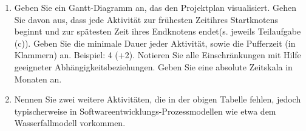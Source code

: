 \documentclass{lehramt-informatik-minimal}
\begin{document}
\begin{enumerate}

\item Geben Sie ein Gantt-Diagramm an, das den Projektplan visualisiert.
Gehen Sie davon aus, dass jede Aktivität zur frühesten Zeitihres
Startknotens beginnt und zur spätesten Zeit ihres Endknotens endet(s.
jeweils Teilaufgabe (c)). Geben Sie die minimale Dauer jeder Aktivität,
sowie die Pufferzeit (in Klammern) an. Beispiel: 4 (+2). Notieren Sie
alle Einschränkungen mit Hilfe geeigneter Abhängigkeitsbeziehungen.
Geben Sie eine absolute Zeitskala in Monaten an.


\item Nennen Sie zwei weitere Aktivitäten, die in der obigen Tabelle
fehlen, jedoch typischerweise in Softwareentwicklungs-Prozessmodellen
wie etwa dem Wasserfallmodell vorkommen.
\end{enumerate}
\end{document}
